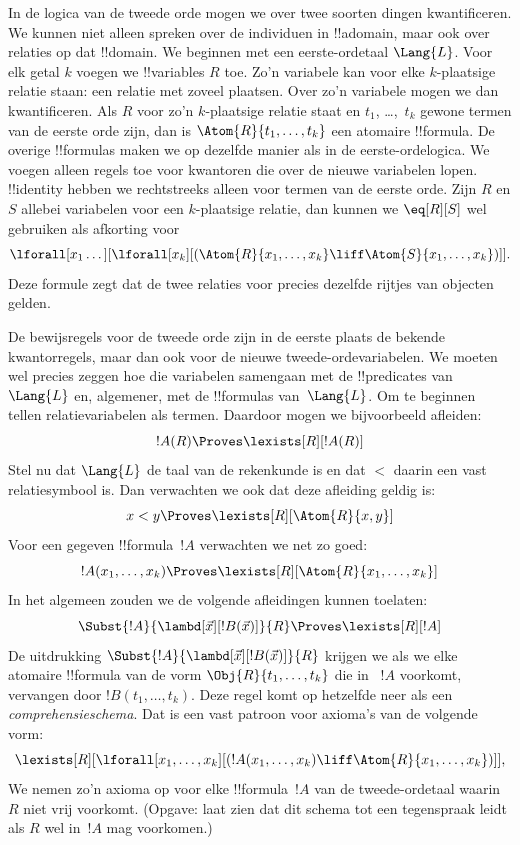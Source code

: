 \documentclass[../../../include/open-logic-section]{subfiles}
\begin{document}


In de logica van de tweede orde mogen we over twee soorten dingen
kwantificeren. We kunnen niet alleen spreken over de individuen in
!!a{domain}, maar ook over relaties op dat !!{domain}. We beginnen met een
eerste-ordetaal $\Lang{L}$. Voor elk getal $k$ voegen we !!{variable}s $R$
toe. Zo'n variabele kan voor elke $k$-plaatsige relatie staan: een relatie met
zoveel plaatsen. Over zo'n variabele mogen we dan kwantificeren. Als $R$ voor
zo'n $k$-plaatsige relatie staat en $t_1$, \dots,~$t_k$ gewone termen van de
eerste orde zijn,
dan is $\Atom{R}{t_1,\dots,t_k}$ een atomaire !!{formula}. De overige
!!{formula}s maken we op dezelfde manier als in de eerste-ordelogica. We
voegen alleen regels toe voor kwantoren die over de nieuwe variabelen lopen.
!!{identity} hebben we rechtstreeks alleen voor termen van de eerste orde.
Zijn $R$ en $S$ allebei variabelen voor een $k$-plaatsige relatie, dan kunnen
we $\eq[R][S]$ wel gebruiken als afkorting voor
\[
\lforall[x_1 \dots][\lforall[x_k][(\Atom{R}{x_1, \dots, x_k} \liff
  \Atom{S}{x_1, \dots, x_k})]].
\]
Deze formule zegt dat de twee relaties voor precies dezelfde rijtjes van
objecten gelden.

De bewijsregels voor de tweede orde zijn in de eerste plaats de bekende
kwantorregels, maar dan ook voor de nieuwe tweede-ordevariabelen. We moeten wel
precies zeggen hoe die variabelen samengaan met de !!{predicate}s van
~$\Lang{L}$ en, algemener, met de !!{formula}s van~$\Lang{L}$. Om te beginnen tellen relatievariabelen als
termen. Daardoor mogen we bijvoorbeeld afleiden:
\[
!A(R) \Proves \lexists[R][!A(R)]
\]
Stel nu dat $\Lang{L}$ de taal van de rekenkunde is en dat $<$ daarin een
vast relatiesymbool is. Dan verwachten we ook dat deze afleiding geldig is:
\[
x < y \Proves \lexists[R][\Atom{R}{x,y}]
\]
Voor een gegeven !!{formula}~$!A$ verwachten we net zo goed:
\[
!A(x_1, \dots, x_k) \Proves \lexists[R][\Atom{R}{x_1,\dots,x_k}]
\]
In het algemeen zouden we de volgende afleidingen kunnen toelaten:
\[
\Subst{!A}{\lambd[\vec x][!B(\vec x)]}{R} \Proves
\lexists[R][!A]
\]
De uitdrukking $\Subst{!A}{\lambd[\vec x][!B(\vec x)]}{R}$ krijgen we als
we elke atomaire !!{formula} van de vorm $\Obj{R}{t_1,\dots,t_k}$ die in
~$!A$ voorkomt, vervangen door $!B(t_1, \dots, t_k)$. Deze regel
komt op hetzelfde neer als een {\em comprehensieschema}. Dat is een vast
patroon voor axioma's van de volgende vorm:
\[
\lexists[R][\lforall[x_1, \dots, x_k][(!A(x_1, \dots, x_k) \liff
\Atom{R}{x_1, \dots, x_k})]],
\]
We nemen zo'n axioma op voor elke !!{formula}~$!A$ van de tweede-ordetaal
waarin $R$ niet vrij voorkomt. (Opgave: laat zien dat dit schema tot een
tegenspraak leidt als $R$ wel in~$!A$ mag voorkomen.)
\end{document}
